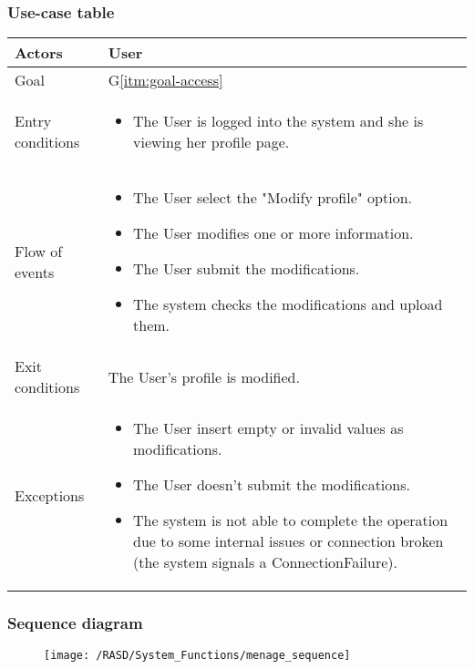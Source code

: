 \subsubsection{Use-case table}
\begin{center}
  \begin{tabular}{ l | p{10cm} }
    \hline
    Actors & User\\ \hline
    Goal & G\ref{itm:goal-access}\\ \hline
    Entry conditions & \begin{itemize}
      \item The User is logged into the system and she is viewing her profile page.   
\end{itemize}
           \\ \hline
    Flow of events &
\begin{itemize}
\item The User select the "Modify profile" option.
\item The User modifies one or more information.
\item The User submit the modifications.
\item The system checks the modifications and upload them.
\end{itemize} \\ \hline
    Exit conditions & The User's profile is modified. \\ \hline
  Exceptions & 
\begin{itemize}
\item The User insert empty or invalid values as modifications.
\item The User doesn't submit the modifications.
\item The system is not able to complete the operation due to some internal issues or connection broken (the system signals a ConnectionFailure).%
\end{itemize} \\ \hline
  \end{tabular}
\end{center}


\subsubsection{Sequence diagram}
\begin{figure}[!ht]
  \centering
  \vspace{0.1cm}
  \texttt{[image: /RASD/System\_Functions/menage\_sequence]}\\
  \vspace{0.1cm}
  \label{fig:menage_sequence} 
\end{figure}

